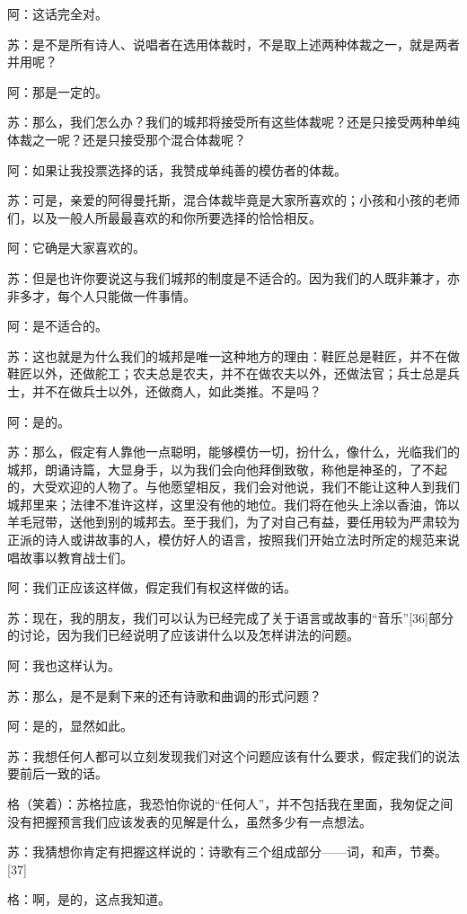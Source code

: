 \documentclass[12pt,oneside]{book}
\begin{document}
阿：这话完全对。

苏：是不是所有诗人、说唱者在选用体裁时，不是取上述两种体裁之一，就是两者并用呢？

阿：那是一定的。

苏：那么，我们怎么办？我们的城邦将接受所有这些体裁呢？还是只接受两种单纯体裁之一呢？还是只接受那个混合体裁呢？

阿：如果让我投票选择的话，我赞成单纯善的模仿者的体裁。

苏：可是，亲爱的阿得曼托斯，混合体裁毕竟是大家所喜欢的；小孩和小孩的老师们，以及一般人所最最喜欢的和你所要选择的恰恰相反。

阿：它确是大家喜欢的。

苏：但是也许你要说这与我们城邦的制度是不适合的。因为我们的人既非兼才，亦非多才，每个人只能做一件事情。

阿：是不适合的。

苏：这也就是为什么我们的城邦是唯一这种地方的理由：鞋匠总是鞋匠，并不在做鞋匠以外，还做舵工；农夫总是农夫，并不在做农夫以外，还做法官；兵士总是兵士，并不在做兵士以外，还做商人，如此类推。不是吗？

阿：是的。

苏：那么，假定有人靠他一点聪明，能够模仿一切，扮什么，像什么，光临我们的城邦，朗诵诗篇，大显身手，以为我们会向他拜倒致敬，称他是神圣的，了不起的，大受欢迎的人物了。与他愿望相反，我们会对他说，我们不能让这种人到我们城邦里来；法律不准许这样，这里没有他的地位。我们将在他头上涂以香油，饰以羊毛冠带，送他到别的城邦去。至于我们，为了对自己有益，要任用较为严肃较为正派的诗人或讲故事的人，模仿好人的语言，按照我们开始立法时所定的规范来说唱故事以教育战士们。

阿：我们正应该这样做，假定我们有权这样做的话。

苏：现在，我的朋友，我们可以认为已经完成了关于语言或故事的“音乐”[36]部分的讨论，因为我们已经说明了应该讲什么以及怎样讲法的问题。

阿：我也这样认为。

苏：那么，是不是剩下来的还有诗歌和曲调的形式问题？

阿：是的，显然如此。

苏：我想任何人都可以立刻发现我们对这个问题应该有什么要求，假定我们的说法要前后一致的话。

格（笑着）：苏格拉底，我恐怕你说的“任何人”，并不包括我在里面，我匆促之间没有把握预言我们应该发表的见解是什么，虽然多少有一点想法。

苏：我猜想你肯定有把握这样说的：诗歌有三个组成部分——词，和声，节奏。[37]

格：啊，是的，这点我知道。
\end{document}
